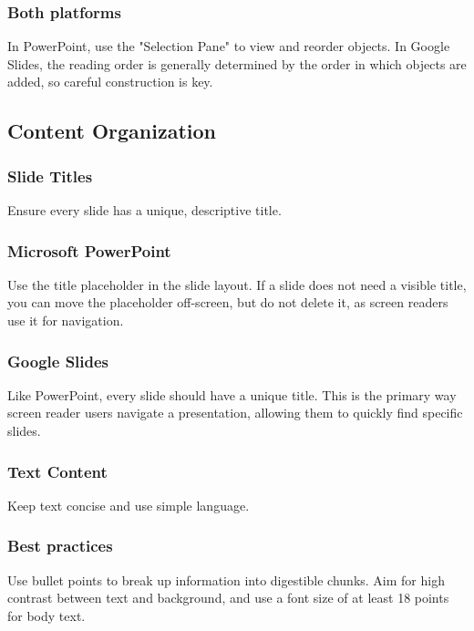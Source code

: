\subsubsection{Both platforms}\label{ch15:sssec:reading-order-both}
In PowerPoint, use the "Selection Pane" to view and reorder objects. In Google Slides, the reading order is generally determined by the order in which objects are added, so careful construction is key.

\subsection{Content Organization}\label{ch15:ssec:content-org}

\subsubsection{Slide Titles}\label{ch15:sssec:slide-titles}
Ensure every slide has a unique, descriptive title.

\subsubsection{Microsoft PowerPoint}\label{ch15:sssec:ppt-titles}
Use the title placeholder in the slide layout. If a slide does not need a visible title, you can move the placeholder off-screen, but do not delete it, as screen readers use it for navigation.

\subsubsection{Google Slides}\label{ch15:sssec:slides-titles}
Like PowerPoint, every slide should have a unique title. This is the primary way screen reader users navigate a presentation, allowing them to quickly find specific slides.

\subsubsection{Text Content}\label{ch15:sssec:text-content}
Keep text concise and use simple language.

\subsubsection{Best practices}\label{ch15:sssec:text-content-best-practices}
Use bullet points to break up information into digestible chunks. Aim for high contrast between text and background, and use a font size of at least 18 points for body text.

